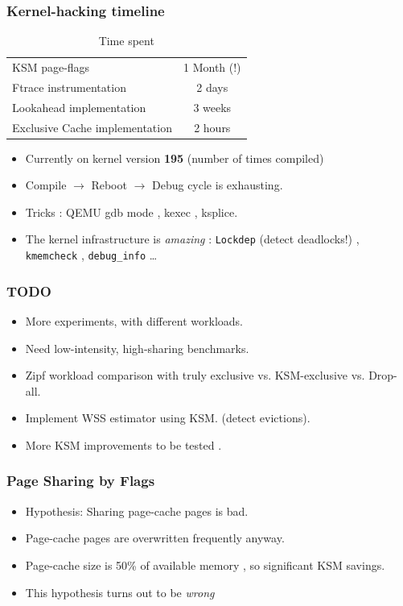 \documentclass{beamer}
\begin{document}
\begin{frame}
  \frametitle {Kernel-hacking timeline}
  \begin{table}
    \centering
    \begin{tabular}{lc}
      KSM page-flags & 1 Month (!) \\
      Ftrace instrumentation & 2 days\\
      Lookahead implementation  & 3 weeks  \\
      Exclusive Cache implementation & 2 hours  \\ 
    \end{tabular}
    \caption{Time spent}
  \end{table}

  \begin{itemize}
  \item Currently on kernel version \textbf{195} (number of times compiled)
  \item Compile $\rightarrow$ Reboot $\rightarrow$ Debug cycle is exhausting.
  \item Tricks : QEMU gdb mode , kexec , ksplice. 
  \item The kernel infrastructure is \emph{amazing} :  \texttt{Lockdep} (detect deadlocks!) , \texttt{kmemcheck} , \texttt{debug\_info} \ldots
  \end{itemize}

\end{frame}

\begin{frame}
  \frametitle{TODO}
  \begin{itemize}
  \item More experiments, with different workloads.
  \item Need low-intensity, high-sharing benchmarks. 
  \item Zipf workload comparison with truly exclusive vs. KSM-exclusive vs. Drop-all.
  \item Implement WSS estimator using KSM. (detect evictions).
  \item More KSM improvements to be tested .
  \end{itemize}
\end{frame}




\begin{frame}
  \frametitle{Page Sharing by Flags}
\begin{itemize}
  \item Hypothesis: Sharing page-cache pages is bad.
  \item Page-cache pages are overwritten frequently anyway.
  \item Page-cache size is 50\% of available memory , so significant KSM savings.
  \item This hypothesis turns out to be \emph{wrong} 
\end{itemize}
\end{frame}
\end{document}
